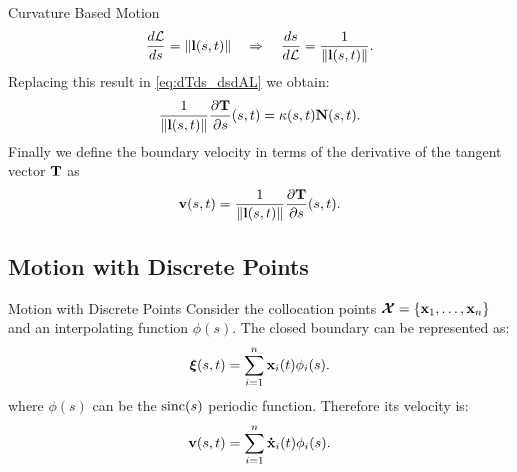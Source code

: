 \documentclass[usenames,dvipsnames]{beamer}
\begin{document}
\begin{frame}{Curvature Based Motion}
\begin{equation*}
    \frac{d\mathcal{L}}{ds} = \left\lVert\mathbf{l}(s,t)\right\rVert\quad \Rightarrow  \quad \frac{ds}{d\mathcal{L}} = \frac{1}{\left\lVert\mathbf{l}(s,t)\right\rVert}.
\end{equation*}
Replacing this result in \eqref{eq:dTds_dsdAL} we obtain:
\begin{equation*}
    \frac{1}{\left\lVert\mathbf{l}(s,t)\right\rVert} \frac{\partial \mathbf{T}}{\partial s}(s,t) = \kappa(s,t)\mathbf{N}(s,t).
\end{equation*}
Finally we define the boundary velocity in terms of the derivative of the tangent vector $\mathbf{T}$ as
\begin{equation*}
    \mathbf{v}(s,t) = \frac{1}{\left\lVert\mathbf{l}(s,t)\right\rVert} \frac{\partial \mathbf{T}}{\partial s}(s,t).
\end{equation*}
\end{frame}

\subsection{Motion with Discrete Points}
\begin{frame}{Motion with Discrete Points}
Consider the collocation points $\vertices = \{\x_1, \ldots, \x_n\}$ and an interpolating function $\phi(s)$. The closed boundary can be represented as:
\begin{equation*}
    \vxi(s,t) = \sum_{i=1}^n \x_i(t) \phi_i(s).
\end{equation*}
where $\phi(s)$ can be the $\operatorname{sinc}(s)$ periodic function. Therefore its velocity is:
\begin{equation*}
    \vel(s,t) = \sum_{i=1}^n \dotx_i(t) \phi_i(s).
\end{equation*}
\end{frame}
\end{document}
